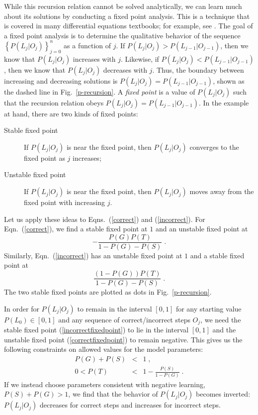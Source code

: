 \documentclass[jedm,acmnow]{acmtrans2m}
\begin{document}
While this recursion relation cannot be solved analytically, we can learn
much about its solutions by conducting a fixed point analysis. 
This is a technique that is covered in many differential equations textbooks; for
example, see \cite{blanchard_differential_2006}.  The goal of a
fixed point  analysis is to determine the qualitative behavior of the sequence
$\left\{P(L_j|O_j)\right\}_{j=0}^n$ as a
function of $j$.  If $P(L_j|O_j)>P(L_{j-1}|O_{j-1})$, then we know
that $P(L_j|O_j)$
increases with $j$.  Likewise, if $P(L_j|O_j)<P(L_{j-1}|O_{j-1})$,
then we know that $P(L_j|O_j)$ decreases with $j$.  Thus, the 
boundary between increasing and decreasing solutions is 
$P(L_j|O_j)=P(L_{j-1}|O_{j-1})$, shown as the dashed line in Fig.~\ref{p-recursion}.
A {\em fixed point} is a value of $P(L_j|O_j)$ such that the recursion
relation obeys $P(L_j|O_j)=P(L_{j-1}|O_{j-1})$.  In the example at
hand, there are two kinds of fixed points:
\begin{description}
  \item[Stable fixed point] If $P(L_j|O_j)$ is near the fixed point,
    then $P(L_j|O_j)$ converges to the fixed point as $j$ increases; 
  \item[Unstable fixed point]  If $P(L_j|O_j)$ is near the fixed
    point, then $P(L_j|O_j)$ moves away from the fixed point with
    increasing $j$. 
\end{description}

Let us apply these ideas to Eqns.~(\ref{correct}) and (\ref{incorrect}).
For Eqn.~(\ref{correct}), we find a stable fixed point at $1$ and 
an unstable fixed point at
%
\begin{equation}
    - \frac{P(G) P(T)}{1-P(G)-P(S)} \; .
      \label{correctfixedpoint}
\end{equation}
%
Similarly, Eqn.~(\ref{incorrect}) has an unstable fixed point at $1$
and a stable fixed point at
%
\begin{equation}
    \frac{\left(1-P(G)\right) P(T)}{1-P(G)-P(S)} \; . 
       \label{incorrectfixedpoint}
\end{equation}
%
The two stable fixed points are plotted as dots in Fig.~\ref{p-recursion}.


In order for $P(L_j|O_j)$ to remain in the interval $\left[0,1\right]$ 
for any starting value $P(L_0)\in \left[0,1\right]$ and any sequence of 
correct/incorrect steps $O_j$, 
we need the stable fixed point (\ref{incorrectfixedpoint})
to lie in the interval $\left[0,1\right]$ and the unstable fixed point 
(\ref{correctfixedpoint}) to remain negative.  This gives us the following
constraints on allowed values for the model parameters:
%
\begin{eqnarray}
        P(G)+P(S)&<& 1 \;, \label{littleconstraint}\\
        0 < P(T) &<& 1-\frac{P(S)}{1-P(G)}  \; .
        \label{bigconstraint}
\end{eqnarray}
%
If we instead choose parameters consistent with negative learning,
$P(S)+P(G)>1$, we find that the behavior of $P(L_j|O_j)$ becomes inverted: 
$P(L_j|O_j)$ decreases for correct steps and increases for incorrect steps.
\end{document}
